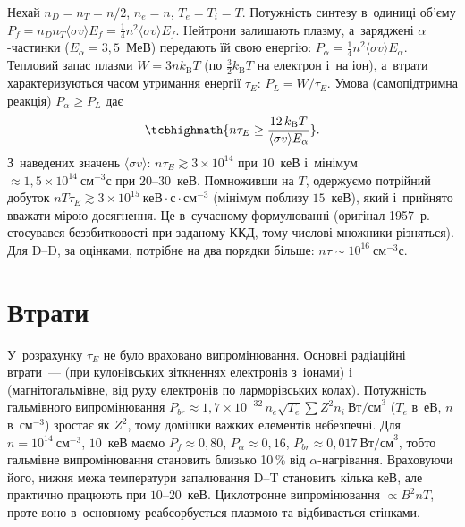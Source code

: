 Нехай $n_D=n_T=n/2$, $n_e=n$, $T_e=T_i=T$. Потужність синтезу в~одиниці об'єму
$P_f=n_Dn_T\langle\sigma v\rangle E_f=\tfrac14n^2\langle\sigma v\rangle E_f$. Нейтрони
залишають плазму, а~заряджені $\alpha$-частинки ($E_\alpha=3{,}5$~МеВ) передають їй свою
енергію: $P_\alpha=\tfrac14n^2\langle\sigma v\rangle E_\alpha$. Тепловий запас плазми
$W=3nk_{\mathrm B}T$ (по $\tfrac32k_{\mathrm B}T$ на електрон і~на іон), а~втрати
характеризуються часом утримання енергії $\tau_E$: $P_L=W/\tau_E$. Умова
 (самопідтримна реакція) $P_\alpha\geq P_L$ дає
\begin{equation}\label{eq:lawson}
	\tcbhighmath{n\tau_E\geq\frac{12\,k_{\mathrm B}T}{\langle\sigma v\rangle E_\alpha}}.
\end{equation}
З~наведених значень $\langle\sigma v\rangle$: $n\tau_E\gtrsim3\times10^{14}$ при $10$~кеВ
і~мінімум $\approx1{,}5\times10^{14}~\mathrm{см}^{-3}\mathrm{с}$ при $20$--$30$~кеВ.
Помноживши на $T$, одержуємо потрійний добуток
$nT\tau_E\gtrsim3\times10^{15}~\text{кеВ}\cdot\mathrm{с}\cdot\mathrm{см}^{-3}$ (мінімум
поблизу $15$~кеВ), який і~прийнято вважати мірою досягнення. Це 
в~сучасному формулюванні (оригінал 1957~р. стосувався беззбитковості при заданому ККД,
тому числові множники різняться). Для D--D, за оцінками, потрібне на два порядки більше:
$n\tau\sim10^{16}~\mathrm{см}^{-3}\mathrm{с}$.



\section{Втрати}



У~розрахунку $\tau_E$ не було враховано випромінювання. Основні радіаційні втрати~---
 (при кулонівських зіткненнях електронів з~іонами) і~
(магнітогальмівне, від руху електронів по ларморівських колах). Потужність гальмівного
випромінювання $P_{br}\approx1{,}7\times10^{-32}\,n_e\sqrt{T_e}\sum
Z^2n_i~\mathrm{Вт/см}^3$ ($T_e$ в~еВ, $n$ в~$\mathrm{см}^{-3}$) зростає як $Z^2$, тому
домішки важких елементів небезпечні. Для $n=10^{14}~\mathrm{см}^{-3}$, $10$~кеВ маємо
$P_f\approx0{,}80$, $P_\alpha\approx0{,}16$, $P_{br}\approx0{,}017~\mathrm{Вт/см}^3$,
тобто гальмівне випромінювання становить близько 10\,\% від $\alpha$-нагрівання.
Враховуючи його, нижня межа температури запалювання D--T становить кілька кеВ, але
практично працюють при $10$--$20$~кеВ. Циклотронне випромінювання $\propto B^2nT$, проте
воно в~основному реабсорбується плазмою та відбивається стінками.



